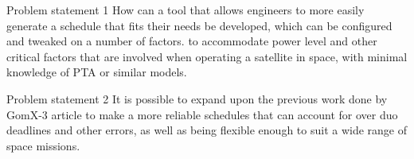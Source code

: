 

Problem statement 1
How can a tool that allows engineers to more easily generate a schedule that fits their needs be developed, which can be configured and tweaked on a number of factors. to accommodate power level and other critical factors that are involved when operating a satellite in space, with minimal knowledge of PTA or similar models.

Problem statement 2
It is possible to expand upon the previous work done by GomX-3 article to make a more reliable schedules that can account for over duo deadlines and other errors, as well as being flexible enough to suit a wide range of space missions.



	



